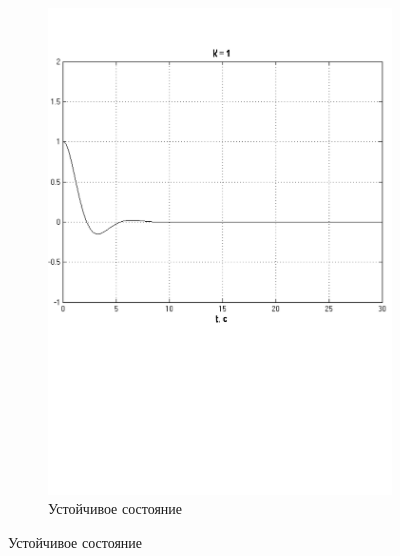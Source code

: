 \documentclass[a4paper, 11pt, russian]{article}
\begin{document}
\begin{figure}[ht!]
\begin{subfigure}[b]{0.48\textwidth}
            \includegraphics[width = \textwidth]{stable}
            \centering
            \caption{Устойчивое состояние}
        \end{subfigure}
        

\end{figure}
\end{document}
